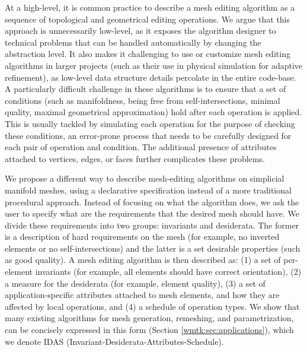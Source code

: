 At a high-level, it is common practice to describe a mesh editing algorithm as a sequence of topological and geometrical editing operations. We argue that this approach is unnecessarily low-level, as it exposes the algorithm designer to technical problems that can be handled automatically by changing the abstraction level. It also makes it challenging to use or customize mesh editing algorithms in larger projects (such as their use in physical simulation for adaptive refinement), as low-level data structure details percolate in the entire code-base. 
{A particularly difficult challenge in these algorithms is to ensure that a set of conditions (such as manifoldness, being free from self-intersections, minimal quality, maximal geometrical approximation) hold after each operation is applied. This is usually tackled by simulating each operation for the purpose of checking these conditions, an error-prone process that needs to be carefully designed for each pair of operation and condition. The additional presence of attributes attached to vertices, edges, or faces further complicates these problems.}

We propose a different way to describe mesh-editing algorithms on simplicial manifold meshes, using a declarative specification instead of a more traditional procedural approach. Instead of focusing on what the algorithm does, we ask the user to specify what are the requirements that the desired mesh should have. We divide these requirements into two groups: invariants and desiderata. The former is a description of hard requirements on the mesh (for example, no inverted elements or no self-intersections) and the latter is a set desirable properties (such as good quality). A mesh editing algorithm is then described as: (1) a set of per-element invariants (for example, all elements should have correct orientation), (2) a measure for the desiderata (for example, element quality), (3) a set of application-specific attributes attached to mesh elements, and how they are affected by local operations, and (4) a schedule of operation types. We show that many existing algorithms for mesh generation, remeshing, and parametrization, can be concisely expressed in this form (Section \ref{wmtk:sec:applications}), which we denote IDAS (Invariant-Desiderata-Attributes-Schedule).

